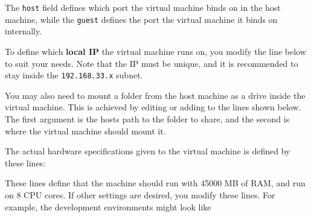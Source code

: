 The \texttt{host} field defines which port the virtual machine binds on
in the host machine, while the \texttt{guest} defines the port the
virtual machine it binds on internally.

To define which \textbf{local IP} the virtual machine runs on, you
modify the line below to suit your needs. Note that the IP must be
unique, and it is recommended to stay inside the \texttt{192.168.33.x}
subnet.

\begin{Shaded}
\begin{Highlighting}[numbers=left,,]
\end{Highlighting}
\end{Shaded}

You may also need to mount a folder from the host machine as a drive
inside the virtual machine. This is achieved by editing or adding to the
lines shown below. The first argument is the hosts path to the folder to
share, and the second is where the virtual machine should mount it.

\begin{Shaded}
\begin{Highlighting}[numbers=left,,]
\NormalTok{, }
\NormalTok{, }
\end{Highlighting}
\end{Shaded}

The actual hardware specifications given to the virtual machine is
defined by these lines:


\begin{Shaded}
\begin{Highlighting}[numbers=left,,]
  
\end{Highlighting}
\end{Shaded}

These lines define that the machine should run with 45000 MB of RAM, and
run on 8 CPU cores. If other settings are desired, you modify these
lines. For example, the development environments might look like


